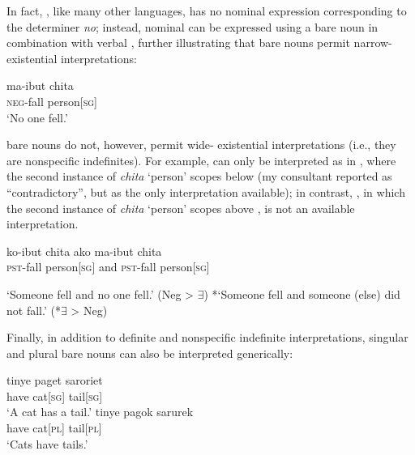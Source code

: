 \documentclass[output=paper]{LSP/langsci}
\begin{document}
\noindent In fact, , like many other languages, has no nominal expression corresponding to the  determiner \textit{no}; instead, nominal  can be expressed using a bare noun in combination with verbal , further illustrating that bare nouns permit narrow- existential interpretations:

\ea \label{ex:landman:negbarenoun}
  \gll ma-ibut chita\\	
	   \textsc{neg}-fall person[\textsc{sg}]\\
\glt ‘No one fell.’
\z 

 bare nouns do not, however, permit wide- existential interpretations (i.e., they are nonspecific indefinites). For example,  can only be interpreted as in , where the second instance of \textit{chita} ‘person’ scopes below  (my consultant reported  as \textquotedblleft contradictory\textquotedblright, but as the only interpretation available); in contrast, , in which the second instance of \textit{chita} ‘person’ scopes above , is not an available interpretation.

\begin{exe}
\ex \label{ex:landman:scopesg}
  \gll ko-ibut chita ako ma-ibut chita\\	
	   \textsc{pst}-fall person[\textsc{sg}] and \textsc{pst}-fall person[\textsc{sg}]\\
  \begin{xlist}
  \ex \label{ex:landman:narrow}‘Someone fell and no one fell.’ (Neg > $\exists$)
  \ex \label{ex:landman:wide} *‘Someone fell and someone (else) did not fall.’ (*$\exists$ > Neg)
  \end{xlist}   
\end{exe}

Finally, in addition to definite and nonspecific indefinite interpretations, singular and plural bare nouns can also be interpreted generically:

\ea   
  \ea \label{ex:landman:gensg}
     \gll tinye paget saroriet\\
          have cat[\textsc{sg}] tail[\textsc{sg}]\\ 
     \glt ‘A cat has a tail.’
  \ex \label{ex:landman:genpl}
     \gll tinye pagok sarurek\\
          have cat[\textsc{pl}] tail[\textsc{pl}]\\ 
     \glt ‘Cats have tails.’
  \z
\z 
\end{document}
